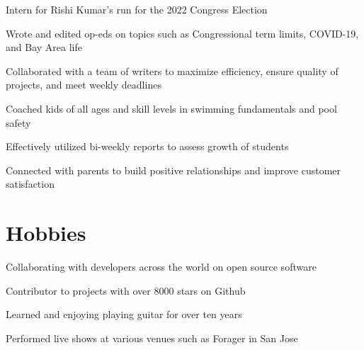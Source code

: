 \documentclass[letterpaper]{resume-shreeram}
\begin{document}
\begin{compactitem}
    \item Intern for Rishi Kumar's run for the 2022 Congress Election

    \item Wrote and edited op-eds on topics such as Congressional term
      limits, COVID-19, and Bay Area life

    \item Collaborated with a team of writers to maximize efficiency,
      ensure quality of projects, and meet weekly deadlines
\end{compactitem}

\begin{compactitem}
    \item Coached kids of all ages and skill levels in swimming
      fundamentals and pool safety

    \item Effectively utilized bi-weekly reports to assess growth of
      students

    \item Connected with parents to build positive relationships and
      improve customer satisfaction
\end{compactitem}

\section{Hobbies}

\begin{compactitem}
  \item Collaborating with developers across the world on open source
    software

  \item Contributor to projects with over 8000 stars on Github
\end{compactitem}

\begin{compactitem}
  \item Learned and enjoying playing guitar for over ten years

  \item Performed live shows at various venues such as Forager in San
    Jose
\end{compactitem}
\end{document}
